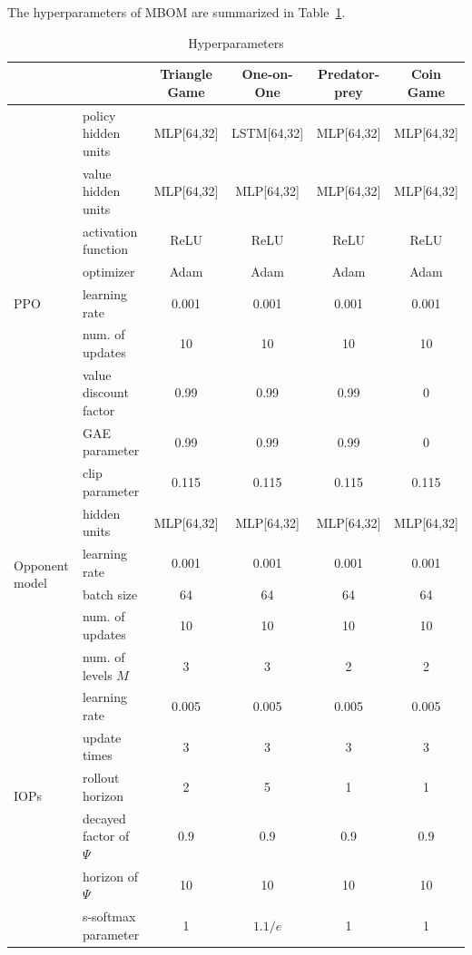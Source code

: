 \documentclass{article}
\begin{document}
The hyperparameters of MBOM are summarized in Table~\ref{tb:hyper-param}.

\begin{table}[h]
\renewcommand\arraystretch{1.1}
	\caption{Hyperparameters}
	\label{tb:hyper-param}
    \centering
    \begin{small}
    \begin{tabular}{llcccc}
    \toprule
    \multicolumn{2}{c}{} &Triangle Game & One-on-One  & Predator-prey & Coin Game\\\midrule
    \multirow{9}{*}{PPO}
    &policy hidden units & MLP[64,32] & LSTM[64,32] & MLP[64,32] & MLP[64,32]\\
    &value hidden units & MLP[64,32] & MLP[64,32] & MLP[64,32]& MLP[64,32]\\
    &activation function & ReLU & ReLU & ReLU & ReLU\\
    &optimizer & Adam & Adam & Adam & Adam\\
    &learning rate & 0.001 & 0.001 & 0.001 & 0.001\\
    &num. of updates & 10 & 10 & 10 & 10\\
    &value discount factor & 0.99 & 0.99 & 0.99 & 0\\
    &GAE parameter & 0.99 & 0.99 & 0.99 & 0\\
    &clip parameter & 0.115 & 0.115 & 0.115 & 0.115\\ \midrule
    \multirow{4}{*}{Opponent model}
    &hidden units & MLP[64,32] & MLP[64,32] & MLP[64,32] & MLP[64,32]\\
    &learning rate & 0.001 & 0.001 & 0.001 & 0.001\\
    &batch size & 64 & 64 & 64 & 64\\
    &num. of updates & 10 & 10 & 10 & 10\\ \midrule
    \multirow{7}{*}{IOPs}
    &num. of levels $M$ & 3 & 3 & 2 & 2\\
    &learning rate & 0.005 & 0.005 & 0.005 & 0.005\\
    &update times & 3 & 3 & 3 & 3\\ 
    &rollout horizon & 2 & 5 & 1 & 1 \\
    &decayed factor of $\Psi$ & 0.9 & 0.9 & 0.9 & 0.9 \\
    &horizon of $\Psi$ & 10 & 10 & 10 & 10 \\
    &s-softmax parameter & 1 & $1.1/e$ & 1 & 1\\
    \bottomrule
    \end{tabular}
    \end{small}
\end{table}
\end{document}
